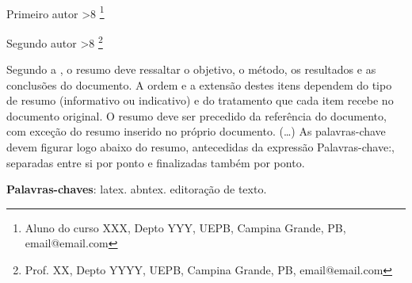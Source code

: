 \documentclass[article,12pt,oneside,a4paper,chapter=TITLE,english,brazil]{abntex2}
\newcounter{savefootnote}
\newcounter{symfootnote}
\newcommand{\symfootnote}[1]{%
	\setcounter{savefootnote}{\value{footnote}}%
	\setcounter{footnote}{\value{symfootnote}}%
	\ifnum\value{footnote}>8\setcounter{footnote}{0}\fi%
	\let\oldthefootnote=\thefootnote%
	\renewcommand{\thefootnote}{\fnsymbol{footnote}}%
	\footnote{#1}%
	\let\thefootnote=\oldthefootnote%
	\setcounter{symfootnote}{\value{footnote}}%
	\setcounter{footnote}{\value{savefootnote}}%
}
\begin{document}
\tableofcontents*
\cleardoublepage


\textual


\begin{center}
  {\ABNTEXchapterfont\bfseries\MakeUppercase{\imprimirtitulo}} \\
  \vspace{\onelineskip}
  {\ABNTEXchapterfont\bfseries\MakeUppercase{\imprimirtituloestrangeiro}} 
\end{center}

\vspace{\onelineskip}
\hfill Primeiro autor\symfootnote{Aluno do curso XXX, Depto YYY, UEPB, Campina Grande, PB, email@email.com}

\hfill Segundo autor\symfootnote{Prof. XX, Depto YYYY, UEPB, Campina Grande, PB, email@email.com}



\setlength{\absparsep}{18pt} %
\begin{resumo}
	Segundo a , o resumo deve ressaltar o objetivo, o método, os resultados e as conclusões do documento. A ordem e a extensão destes itens dependem do tipo de resumo (informativo ou indicativo) e do tratamento que cada item recebe no documento original. O resumo deve ser precedido da referência do documento, com exceção do resumo inserido no próprio documento. (\ldots) As palavras-chave devem figurar logo abaixo do resumo, antecedidas da expressão Palavras-chave:, separadas entre si por ponto e finalizadas também por ponto.
	
	\textbf{Palavras-chaves}: latex. abntex. editoração de texto.
\end{resumo}
\end{document}

